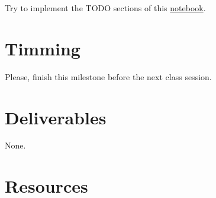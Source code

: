 Try to implement the TODO sections of this \href{https://github.com/Sistemas-Multimedia/Sistemas-Multimedia.github.io/blob/master/milestones/09-III_coding/III_compression.ipynb}{notebook}.

\begin{comment}
Please, create an experiment in which the frame quantization step is
different for each frame of a sequence, and another experiment that
uses the same quantization step for all the frames. Compute the
average RD curves. Which one is better? Do you think that
\begin{equation*}
  D = \sum_i D_i,
\end{equation*}
where $D$ is the distortion generated for the complete sequence and
$D_i$ is the distortion only for the $i$-th frame, holds?
\end{comment}


\section{Timming}

Please, finish this milestone before the next class session.

\section{Deliverables}

None.

\section{Resources}

\renewcommand{\addcontentsline}[3]{}%


